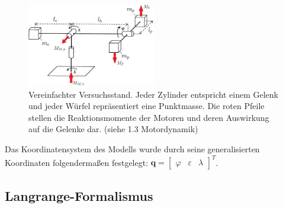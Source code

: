 \documentclass[10pt,twocolumn]{article}
\begin{document}
	\begin{figure}[ht]
		\centering
		\includegraphics[width=0.5\textwidth]{images/setup_mom}
		\caption{Vereinfachter Versuchsstand. Jeder Zylinder entspricht einem Gelenk und jeder Würfel repräsentiert eine Punktmasse. Die roten Pfeile stellen die Reaktionsmomente der Motoren und deren Auswirkung auf die Gelenke dar. (siehe 1.3 Motordynamik) }
		\label{setup}
	\end{figure}
	Das Koordinatensystem des Modells wurde durch seine generalisierten Koordinaten folgendermaßen festgelegt: $\bm q = \begin{bmatrix}
	\varphi & \varepsilon & \lambda
	\end{bmatrix}^T $.
	
	\subsection{Langrange-Formalismus}
	
\end{document}
